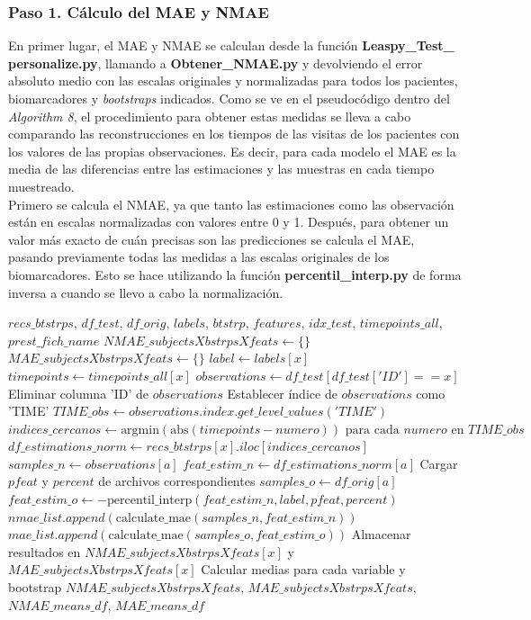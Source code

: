 \subsubsection{Paso 1. Cálculo del MAE y NMAE}
En primer lugar, el MAE y NMAE se calculan desde la función \textbf{Leaspy\_Test\_
personalize.py}, llamando a \textbf{Obtener\_NMAE.py} y devolviendo el error absoluto medio con las escalas originales y normalizadas para todos los pacientes, biomarcadores y \textit{bootstraps} indicados. Como se ve en el pseudocódigo dentro del \textit{Algorithm 8}, el procedimiento para obtener estas medidas se lleva a cabo comparando las reconstrucciones en los tiempos de las visitas de los pacientes con los valores de las propias observaciones. Es decir, para cada modelo el MAE es la media de las diferencias entre las estimaciones y las muestras en cada tiempo muestreado.\\

Primero se calcula el NMAE, ya que tanto las estimaciones como las observación están en escalas normalizadas con valores entre 0 y 1. Después, para obtener un valor más exacto de cuán precisas son las predicciones se calcula el MAE, pasando previamente todas las medidas a las escalas originales de los biomarcadores. Esto se hace utilizando la función \textbf{percentil\_interp.py} de forma inversa a cuando se llevo a cabo la normalización.
	
\begin{algorithm}
	\caption{Obtener NMAE y MAE}
	\begin{algorithmic}[1]
		\REQUIRE $recs\_btstrps$, $df\_test$, $df\_orig$, $labels$, $btstrp$, $features$, $idx\_test$, $timepoints\_all$, $prest\_fich\_name$
		\STATE $NMAE\_subjectsXbstrpsXfeats \gets \{\}$
		\STATE $MAE\_subjectsXbstrpsXfeats \gets \{\}$
		\STATE $label \gets labels[x]$
		\STATE $timepoints \gets timepoints\_all[x]$
		\STATE $observations \gets df\_test[df\_test['ID']==x]$
		\STATE Eliminar columna 'ID' de $observations$
		\STATE Establecer índice de $observations$ como 'TIME'
		\STATE $TIME\_obs \gets observations.index.get\_level\_values('TIME')$
		\STATE $indices\_cercanos \gets \text{argmin}(\text{abs}(timepoints - numero)) \text{ para cada } numero \text{ en } TIME\_obs$
		\STATE $df\_estimations\_norm \gets recs\_btstrps[x].iloc[indices\_cercanos]$
		\STATE $samples\_n \gets observations[a]$
		\STATE $feat\_estim\_n \gets df\_estimations\_norm[a]$
		\STATE Cargar $pfeat$ y $percent$ de archivos correspondientes
		\STATE $samples\_o \gets df\_orig[a]$
		\STATE $feat\_estim\_o \gets -\text{percentil\_interp}(feat\_estim\_n, label, pfeat, percent)$
		\STATE $nmae\_list.append(\text{calculate\_mae}(samples\_n, feat\_estim\_n))$
		\STATE $mae\_list.append(\text{calculate\_mae}(samples\_o, feat\_estim\_o))$
		\ENDFOR
		\STATE Almacenar resultados en $NMAE\_subjectsXbstrpsXfeats[x]$ y $MAE\_subjectsXbstrpsXfeats[x]$
		\ENDFOR
		\STATE Calcular medias para cada variable y bootstrap
		\RETURN $NMAE\_subjectsXbstrpsXfeats$, $MAE\_subjectsXbstrpsXfeats$, $NMAE\_means\_df$, $MAE\_means\_df$
	\end{algorithmic}
\end{algorithm}

